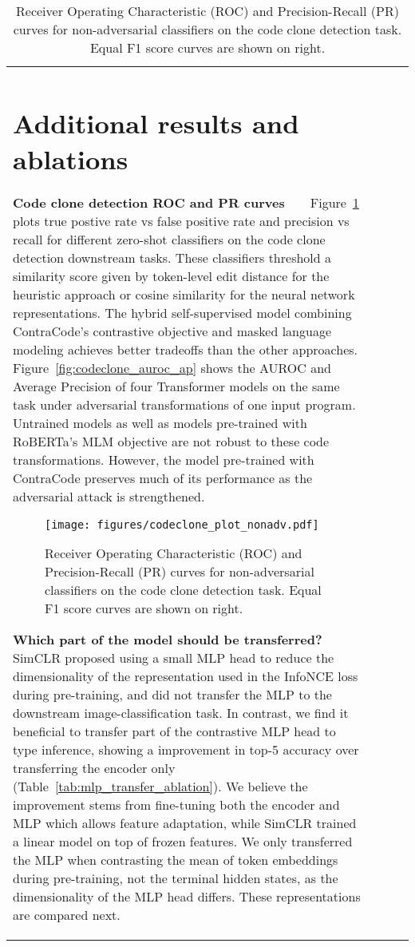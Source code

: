 \documentclass{article}
\newcommand{\ours}[0]{ContraCode}
\begin{document}
\begin{table}[t]
{\begin{tabular}{llcc}
{{\section{Additional results and ablations}
\label{sec:appendix_ablations}

\textbf{Code clone detection ROC and PR curves}~~~~Figure~\ref{fig:codeclone_curves} plots true postive rate vs false positive rate and precision vs recall for different zero-shot classifiers on the code clone detection downstream tasks. These classifiers threshold a similarity score given by token-level edit distance for the heuristic approach or cosine similarity for the neural network representations. The hybrid self-supervised model combining \ours{}'s contrastive objective and masked language modeling achieves better tradeoffs than the other approaches. Figure~\ref{fig:codeclone_auroc_ap} shows the AUROC and Average Precision of four Transformer models on the same task under adversarial transformations of one input program. Untrained models as well as models pre-trained with RoBERTa's MLM objective are not robust to these code transformations. However, the model pre-trained with \ours{} preserves much of its performance as the adversarial attack is strengthened.

\begin{figure}[t]
    \centering
    \texttt{[image: figures/codeclone\_plot\_nonadv.pdf]}
    \caption{Receiver Operating Characteristic (ROC) and Precision-Recall (PR) curves for non-adversarial classifiers on the code clone detection task. Equal F1 score curves are shown on right.}
    \label{fig:codeclone_curves}
\end{figure}

\textbf{Which part of the model should be transferred?}~~~~
SimCLR \citep{chen2020simple} proposed using a small MLP head to reduce the dimensionality of the representation used in the InfoNCE loss during pre-training, and did not transfer the MLP to the downstream image-classification task. In contrast, we find it beneficial to transfer part of the contrastive MLP head to type inference, showing a  improvement in top-5 accuracy over transferring the encoder only (Table~\ref{tab:mlp_transfer_ablation}). We believe the improvement stems from fine-tuning both the encoder and MLP which allows feature adaptation, while SimCLR trained a linear model on top of frozen features. We only transferred the MLP when contrasting the mean of token embeddings during pre-training, not the terminal hidden states, as the dimensionality of the MLP head differs. These representations are compared next.

}}
\end{tabular}}
\end{table}
\end{document}
